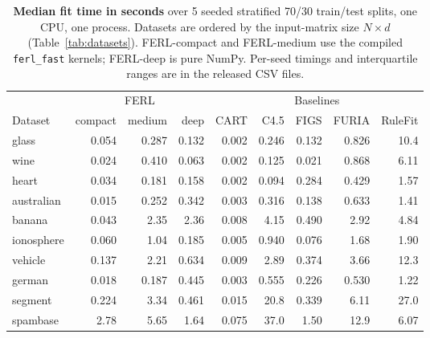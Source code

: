 \begin{table}[t]
\centering
\footnotesize
\setlength{\tabcolsep}{3pt}
\caption{\textbf{Median fit time in seconds} over 5 seeded stratified 70/30 train/test splits, one CPU, one process. Datasets are ordered by the input-matrix size $N\!\times\!d$ (Table~\ref{tab:datasets}). FERL-compact and FERL-medium use the compiled \texttt{ferl\_fast} kernels; FERL-deep is pure NumPy. Per-seed timings and interquartile ranges are in the released CSV files.}
\label{tab:runtime}
\begin{tabular}{@{}lrrrrrrrr@{}}
\toprule
 & \multicolumn{3}{c}{FERL} & \multicolumn{5}{c}{Baselines} \\
\cmidrule(lr){2-4}\cmidrule(l){5-9}
Dataset & compact & medium & deep & CART & C4.5 & FIGS & FURIA & RuleFit \\
\midrule
glass & 0.054 & 0.287 & 0.132 & 0.002 & 0.246 & 0.132 & 0.826 & 10.4 \\
wine & 0.024 & 0.410 & 0.063 & 0.002 & 0.125 & 0.021 & 0.868 & 6.11 \\
heart & 0.034 & 0.181 & 0.158 & 0.002 & 0.094 & 0.284 & 0.429 & 1.57 \\
australian & 0.015 & 0.252 & 0.342 & 0.003 & 0.316 & 0.138 & 0.633 & 1.41 \\
banana & 0.043 & 2.35 & 2.36 & 0.008 & 4.15 & 0.490 & 2.92 & 4.84 \\
ionosphere & 0.060 & 1.04 & 0.185 & 0.005 & 0.940 & 0.076 & 1.68 & 1.90 \\
vehicle & 0.137 & 2.21 & 0.634 & 0.009 & 2.89 & 0.374 & 3.66 & 12.3 \\
german & 0.018 & 0.187 & 0.445 & 0.003 & 0.555 & 0.226 & 0.530 & 1.22 \\
segment & 0.224 & 3.34 & 0.461 & 0.015 & 20.8 & 0.339 & 6.11 & 27.0 \\
spambase & 2.78 & 5.65 & 1.64 & 0.075 & 37.0 & 1.50 & 12.9 & 6.07 \\
\bottomrule
\end{tabular}
\end{table}
